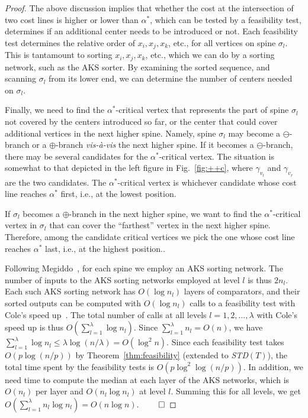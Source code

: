 \documentclass{llncs}
\newcommand{\QED}{\hfill$\qed$}
\begin{document}
{\begin{proof}
The above discussion implies that whether the cost at the intersection of two cost lines
is higher or lower than $\alpha^*$,
which can be tested by a feasibility test, 
determines if an additional center needs to be introduced or not.
Each feasibility test determines the relative order of $x_i, x_j, x_k$, etc.,
for all vertices on spine $\sigma_l$.
This is tantamount to sorting $x_i, x_j, x_k$, etc.,
which we can do by a sorting network, such as the AKS sorter.
By examining the sorted sequence, 
and scanning $\sigma_l$ from its lower end,
we can determine the number of centers needed on $\sigma_l$.
 

Finally, we need to find the $\alpha^*$-critical vertex that represents the part of spine $\sigma_l$
not covered by the centers introduced so far,
or the center that could cover additional vertices in the next higher spine.
Namely,
spine $\sigma_l$ may become a $\ominus$-branch or a $\oplus$-branch {\em vis-\`{a}-vis}
the next higher spine.
If it becomes a $\ominus$-branch,
there may be several candidates for the $\alpha^*$-critical vertex.
The situation is somewhat to that depicted in the left figure in Fig.~\ref{fig:++c},
where $\gamma_{v_l}$ and $\gamma_{v_r}$ are the two candidates.
The $\alpha^*$-critical vertex is whichever candidate whose cost line reaches $\alpha^*$ first,
i.e., at the lowest position.

If $\sigma_l$ becomes a $\oplus$-branch in the next higher spine,
we want to find the $\alpha^*$-critical vertex in $\sigma_l$ that can cover the ``farthest'' vertex
in the next higher spine.
Therefore, among the candidate critical vertices we pick the one whose cost line reaches $\alpha^*$ last,
i.e., at the highest position..

Following Megiddo~\cite{megiddo1983c},
for each spine we employ an AKS sorting network.
The number of inputs to the AKS sorting networks employed at level $l$ is thus $2n_l$.
Each such AKS sorting network has $O(\log n_l)$ layers of comparators,
and their sorted outputs can be computed with $O(\log n_l)$ calls to a feasibility test
with Cole's speed up~\cite{cole1987}.
The total number of calls at all levels $l=1,2,\ldots, \lambda$ with Cole's speed up is thus
$O(\sum_{l=1}^{\lambda} \log n_l)$.
Since $\sum_{l=1}^{\lambda} n_l = O(n)$,
we have $\sum_{l=1}^{\lambda} \log n_l \leq \lambda \log (n/\lambda) = O(\log^2 n)$.
Since each feasibility test takes $O(p\log (n/p))$ by Theorem~\ref{thm:feasibility}
(extended to {\it STD}$(T)$),
the total time spent by the feasibility tests is $O(p\log^2 \log (n/p))$.
In addition, we need time to compute the median at each layer of the AKS networks,
which is $O(n_l)$ per layer and $O(n_l \log n_l)$ at level $l$.
Summing this for all levels, we get
$O(\sum_{l=1}^{\lambda} n_l \log n_l) = O(n\log n)$. 
\QED
\end{proof}


}
\end{document}
